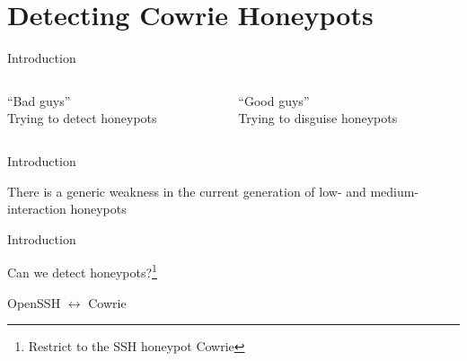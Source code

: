 \section{Detecting Cowrie Honeypots}

\begin{frame}{Introduction}
    \begin{columns}[T]
        \begin{column}{0.5\textwidth}
            \begin{center}
                \enquote{Bad guys}\\
                Trying to detect honeypots
            \end{center}
        \end{column}
        \begin{column}{0.5\textwidth}
            \begin{center}
                \enquote{Good guys}\\
                Trying to disguise honeypots
            \end{center}
        \end{column}
    \end{columns}
\end{frame}

\begin{frame}{Introduction}
    \begin{block}{\citet{vetterl2020}}
        There is a generic weakness in the current generation of low- and medium-interaction honeypots
    \end{block}
\end{frame}

\begin{frame}{Introduction}
    \begin{center}
        Can we detect honeypots?\footnote{Restrict to the SSH honeypot Cowrie}
    \end{center}
    \begin{center}
        OpenSSH $\leftrightarrow$ Cowrie
    \end{center}
\end{frame}

